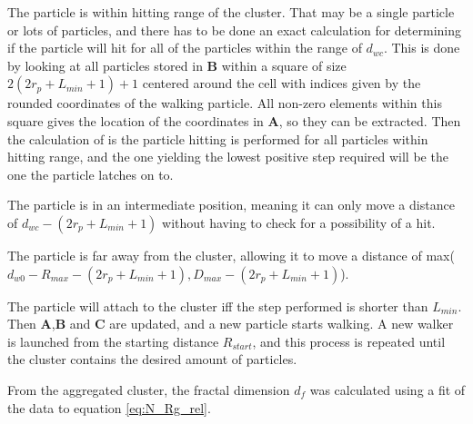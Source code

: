 \begin{itemize}
{\setlength\itemindent{1.0in}\item[$d_{wc} \le 2r_p + L_{min} + 1$:] The particle is within hitting range of the cluster. That may be a single particle or lots of particles, and there has to be done an exact calculation for determining if the particle will hit for all of the particles within the range of $d_{wc}$. This is done by looking at all particles stored in $\textbf{B}$ within a square of size $ 2(2r_p + L_{min} + 1)+1$ centered around the cell with indices given by the rounded coordinates of the walking particle. All non-zero elements within this square gives the location of the coordinates in $\textbf{A}$, so they can be extracted. Then the calculation of is the particle hitting is performed for all particles within hitting range, and the one yielding the lowest positive step required will be the one the particle latches on to. 
\item[$ 2r_p + L_{min} + 1 \le  d_{wc} \le D_{max}$:] The particle is in an intermediate position, meaning it can only move a distance of $d_{wc} - (2r_p + L_{min} + 1)$ without having to check for a possibility of a hit. 
\item[$d_{wc} = D_{max}$:] The particle is far away from the cluster, allowing it to move a distance of max($d_{w0} - R_{max} - (2r_p + L_{min} + 1), D_{max} - (2r_p + L_{min} + 1)$).}
\end{itemize}

The particle will attach to the cluster iff the step performed is shorter than $L_{min}$. Then $\textbf{A}$,$\textbf{B}$ and $\textbf{C}$ are updated, and a new particle starts walking. A new walker is launched from the starting distance $R_{start}$, and this process is repeated until the cluster contains the desired amount of particles. 

From the aggregated cluster, the fractal dimension $d_f$ was calculated using a fit of the data to equation \eqref{eq:N_Rg_rel}. 
